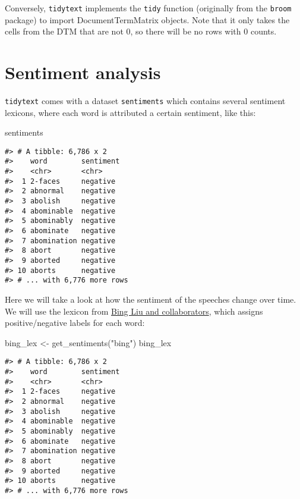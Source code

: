 \documentclass[
]{book}
\newenvironment{Shaded}{\begin{snugshade}}{\end{snugshade}}
\newcommand{\FunctionTok}[1]{\textcolor[rgb]{0.00,0.00,0.00}{#1}}
\newcommand{\NormalTok}[1]{#1}
\newcommand{\OtherTok}[1]{\textcolor[rgb]{0.56,0.35,0.01}{#1}}
\newcommand{\StringTok}[1]{\textcolor[rgb]{0.31,0.60,0.02}{#1}}
\begin{document}
Conversely, \texttt{tidytext} implements the \texttt{tidy} function (originally from the \texttt{broom} package) to import DocumentTermMatrix objects. Note that it only takes the cells from the DTM that are not 0, so there will be no rows with 0 counts.

\hypertarget{sentiment-analysis}{%
\section{Sentiment analysis}\label{sentiment-analysis}}

\texttt{tidytext} comes with a dataset \texttt{sentiments} which contains several sentiment lexicons, where each word is attributed a certain sentiment, like this:

\begin{Shaded}
\begin{Highlighting}[]
\NormalTok{sentiments}
\end{Highlighting}
\end{Shaded}

\begin{verbatim}
#> # A tibble: 6,786 x 2
#>    word        sentiment
#>    <chr>       <chr>    
#>  1 2-faces     negative 
#>  2 abnormal    negative 
#>  3 abolish     negative 
#>  4 abominable  negative 
#>  5 abominably  negative 
#>  6 abominate   negative 
#>  7 abomination negative 
#>  8 abort       negative 
#>  9 aborted     negative 
#> 10 aborts      negative 
#> # ... with 6,776 more rows
\end{verbatim}

Here we will take a look at how the sentiment of the speeches change over time. We will use the lexicon from \href{https://www.cs.uic.edu/~liub/FBS/sentiment-analysis.html}{Bing Liu and collaborators}, which assigns positive/negative labels for each word:

\begin{Shaded}
\begin{Highlighting}[]
\NormalTok{bing\_lex }\OtherTok{\textless{}{-}} \FunctionTok{get\_sentiments}\NormalTok{(}\StringTok{"bing"}\NormalTok{)}
\NormalTok{bing\_lex}
\end{Highlighting}
\end{Shaded}

\begin{verbatim}
#> # A tibble: 6,786 x 2
#>    word        sentiment
#>    <chr>       <chr>    
#>  1 2-faces     negative 
#>  2 abnormal    negative 
#>  3 abolish     negative 
#>  4 abominable  negative 
#>  5 abominably  negative 
#>  6 abominate   negative 
#>  7 abomination negative 
#>  8 abort       negative 
#>  9 aborted     negative 
#> 10 aborts      negative 
#> # ... with 6,776 more rows
\end{verbatim}
\end{document}
